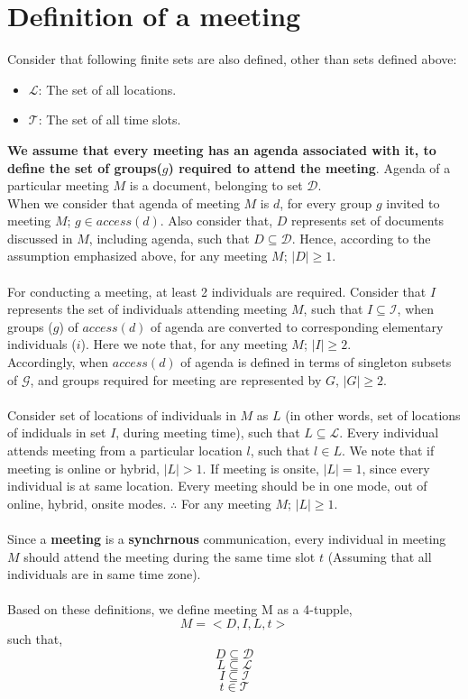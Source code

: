 \documentclass{article}
\begin{document}
\section{Definition of a meeting}
\noindent
Consider that following finite sets are also defined, other than sets defined above:
\begin{itemize}
    \item $\mathcal{L}$: The set of all locations.
    \item $\mathcal{T}$: The set of all time slots.\\
\end{itemize}
\noindent
\textbf{We assume that every meeting has an agenda associated with it, to define the set of groups($g$) required to attend the meeting}. Agenda of a particular meeting $M$ is a document, belonging to set $\mathcal{D}$.\\
When we consider that agenda of meeting $M$ is $d$, for every group $g$ invited to meeting $M$; $g \in access(d)$. Also consider that, $D$ represents set of documents discussed in $M$, including agenda, such that $D \subseteq \mathcal{D}$. Hence, according to the assumption emphasized above, for any meeting $M$; $|D| \geq 1$.\\ \\ 
For conducting a meeting, at least 2 individuals are required. Consider that $I$ represents the set of individuals attending meeting $M$, such that $I \subseteq \mathcal{I}$, when groups ($g$) of $access(d)$ of agenda are converted to corresponding elementary individuals ($i$). Here we note that, for any meeting $M$; $|I| \geq 2$.\\
Accordingly, when $access(d)$ of agenda is defined in terms of singleton subsets of $\mathcal{G}$, and groups required for meeting are represented by $G$, $|G| \geq 2$. \\ \\  
Consider set of locations of individuals in $M$ as $L$ (in other words, set of locations of indiduals in set $I$, during meeting time), such that $L \subseteq \mathcal{L}$. Every individual attends meeting from a particular location $l$, such that $l \in L$. We note that if meeting is online or hybrid, $|L| > 1$. If meeting is onsite, $|L| = 1$, since every individual is at same location. Every meeting should be in one mode, out of online, hybrid, onsite modes. $\therefore$ For any meeting $M$; $|L| \geq 1$. \\ \\
Since a \textbf{meeting} is a \textbf{synchrnous} communication, every individual in meeting $M$ should attend the meeting during the same time slot $t$ (Assuming that all individuals are in same time zone).  \\ \\
Based on these definitions, we define meeting M as a 4-tupple,
    \[ M = < D, I, L, t > \]
such that,
    \[ D \subseteq \mathcal{D} \]
    \[ L \subseteq \mathcal{L} \]
    \[ I \subseteq \mathcal{I} \]
    \[ t \in \mathcal{T} \]
\end{document}
